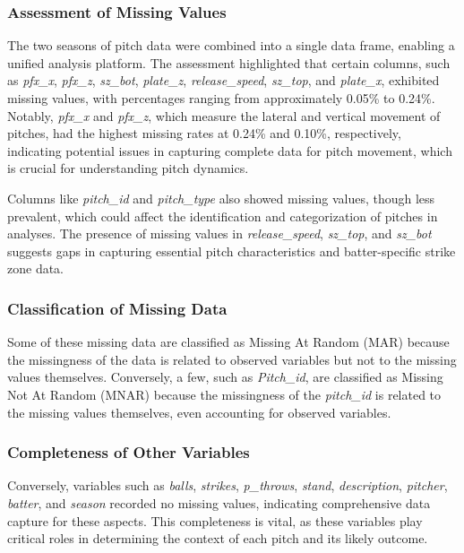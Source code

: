 \documentclass[12pt]{article}
\begin{document}
\subsubsection{Assessment of Missing Values}
The two seasons of pitch data were combined into a single data frame, enabling a unified analysis platform. The assessment highlighted that certain columns, such as \textit{pfx\_x}, \textit{pfx\_z}, \textit{sz\_bot}, \textit{plate\_z}, \textit{release\_speed}, \textit{sz\_top}, and \textit{plate\_x}, exhibited missing values, with percentages ranging from approximately 0.05\% to 0.24\%. Notably, \textit{pfx\_x} and \textit{pfx\_z}, which measure the lateral and vertical movement of pitches, had the highest missing rates at 0.24\% and 0.10\%, respectively, indicating potential issues in capturing complete data for pitch movement, which is crucial for understanding pitch dynamics.

Columns like \textit{pitch\_id} and \textit{pitch\_type} also showed missing values, though less prevalent, which could affect the identification and categorization of pitches in analyses. The presence of missing values in \textit{release\_speed}, \textit{sz\_top}, and \textit{sz\_bot} suggests gaps in capturing essential pitch characteristics and batter-specific strike zone data.

\subsubsection{Classification of Missing Data}
Some of these missing data are classified as Missing At Random (MAR) because the missingness of the data is related to observed variables but not to the missing values themselves. Conversely, a few, such as \textit{Pitch\_id}, are classified as Missing Not At Random (MNAR) because the missingness of the \textit{pitch\_id} is related to the missing values themselves, even accounting for observed variables.

\subsubsection{Completeness of Other Variables}
Conversely, variables such as \textit{balls}, \textit{strikes}, \textit{p\_throws}, \textit{stand}, \textit{description}, \textit{pitcher}, \textit{batter}, and \textit{season} recorded no missing values, indicating comprehensive data capture for these aspects. This completeness is vital, as these variables play critical roles in determining the context of each pitch and its likely outcome.
\end{document}
